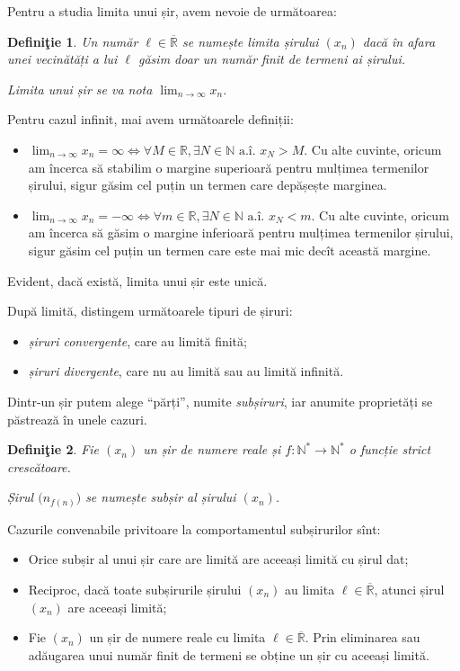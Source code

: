\documentclass[11pt,a4paper]{article}
\newcommand\qq{\enquote}
\newcommand\ds{\displaystyle}
\newcommand\NN{\mathbb{N}}
\newcommand\RR{\mathbb{R}}
\theoremstyle{dotless}
\theoremstyle{dotlessdr}
\newtheorem{definition}{Defini\c{t}ie}[section]
\begin{document}
Pentru a studia limita unui șir, avem nevoie de următoarea:
\begin{definition}\label{def:limita-sir}
  Un număr $\ell \in \overline{\RR}$ se numește \emph{limita șirului $(x_n)$} dacă în
  afara unei vecinătăți a lui $\ell$ găsim doar un număr finit de termeni ai șirului.

  Limita unui șir se va nota $\ds\lim_{n \to \infty} x_n$.
\end{definition}

Pentru cazul infinit, mai avem următoarele definiții:
\begin{itemize}
\item $\ds\lim_{n \to \infty} x_n = \infty \Leftrightarrow \forall M \in \RR, \exists %
  N \in \NN \text{ a.î. } x_N > M$. Cu alte cuvinte, oricum am încerca să stabilim
  o margine superioară pentru mulțimea termenilor șirului, sigur găsim cel puțin un
  termen care depășește marginea.
\item $\ds\lim_{n \to \infty} x_n = -\infty \Leftrightarrow \forall m \in \RR, \exists %
  N \in \NN \text{ a.î. } x_N < m$. Cu alte cuvinte, oricum am încerca să găsim o margine
  inferioară pentru mulțimea termenilor șirului, sigur găsim cel puțin un termen care este
  mai mic decît această margine.
\end{itemize}

Evident, dacă există, limita unui șir este unică.

După limită, distingem următoarele tipuri de șiruri:
\begin{itemize}
  \item \emph{șiruri convergente}, care au limită finită;
  \item \emph{șiruri divergente}, care nu au limită sau au limită infinită.
\end{itemize}

Dintr-un șir putem alege \qq{părți}, numite \emph{subșiruri}, iar anumite
proprietăți se păstrează în unele cazuri.

\begin{definition}\label{def:subsir}
  Fie $(x_n)$ un șir de numere reale și $f : \NN^\ast \to \NN^\ast$ o funcție
  strict crescătoare.

  Șirul $\big( n_{f(n)} \big)$ se numește \emph{subșir} al șirului $(x_n)$.
\end{definition}

Cazurile convenabile privitoare la comportamentul subșirurilor sînt:

\begin{itemize}
  \item Orice subșir al unui șir care are limită are aceeași limită cu șirul dat;
  \item Reciproc, dacă toate subșirurile șirului $(x_n)$ au limita $\ell \in \overline{\RR}$,
    atunci șirul $(x_n)$ are aceeași limită;
  \item Fie $(x_n)$ un șir de numere reale cu limita $\ell \in \overline{\RR}$.
    Prin eliminarea sau adăugarea unui număr finit de termeni se obține un șir cu
    aceeași limită.
\end{itemize}
\end{document}
